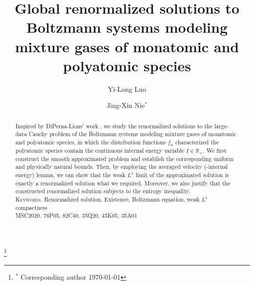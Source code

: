\documentclass[reqno,11pt]{amsart}
\numberwithin{equation}{section}
\def\R{\mathbb{R}}
\begin{document}
\title[Renormalized Solutions to BSMP]
			{Global renormalized solutions to Boltzmann systems modeling mixture gases of monatomic and polyatomic species}

\author[Yi-Long Luo]{Yi-Long Luo}
\address[Yi-Long Luo]
{\newline School of Mathematics, Hunan University, Changsha, 410082, P. R. China}


\author[Jing-Xin Nie]{Jing-Xin Nie${}^*$}
\address[Jing-Xin Nie]{
\newline	School of Mathematics, Hunan University, Changsha, 410082, P. R. China} 


\thanks{${}^*$ Corresponding author \quad \today}

\maketitle

\begin{abstract}
   Inspired by DiPerna-Lions' work \cite{Diperna-Lions}, we study the renormalized solutions to the large-data Cauchy problem of the Boltzmann systems modeling mixture gases of monatomic and polyatomic species, in which the distribution functions $f_\alpha$ characterized the polyatomic species contain the continuous internal energy variable $I \in \R_+$. We first construct the smooth approximated problem and establish the corresponding uniform and physically natural bounds. Then, by employing the averaged velocity (-internal energy) lemma, we can show that the weak $L^1$ limit of the approximated solution is exactly a renormalized solution what we required. Moreover, we also justify that the constructed renormalized solution subjects to the entropy inequality.  \\

   \noindent\textsc{Keywords.} Renormalized solution, Existence, Boltzmann equation, weak $L^1$ compactness \\

   \noindent\textsc{MSC2020.} 76P05, 82C40, 35Q20, 45K05, 35A01
\end{abstract}


%
%


\end{document}
